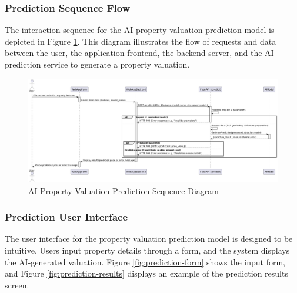 \newpage

\subsubsection{Prediction Sequence Flow}
The interaction sequence for the AI property valuation prediction model is depicted in Figure \ref{fig:ai-prediction-sequence}. This diagram illustrates the flow of requests and data between the user, the application frontend, the backend server, and the AI prediction service to generate a property valuation.

\begin{figure}[htbp]
    \centering
    \includegraphics[width=1\textwidth]{images/sequence_AI_prediction_model.png} %
    \caption{AI Property Valuation Prediction Sequence Diagram}
    \label{fig:ai-prediction-sequence}
\end{figure}


\subsubsection{Prediction User Interface}
The user interface for the property valuation prediction model is designed to be intuitive. Users input property details through a form, and the system displays the AI-generated valuation. Figure \ref{fig:prediction-form} shows the input form, and Figure \ref{fig:prediction-results} displays an example of the prediction results screen.

